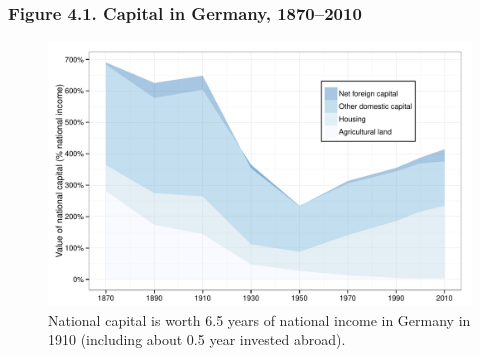 \documentclass[t]{beamer}\usepackage[]{graphicx}\usepackage[]{color}
\newenvironment{knitrout}{}{} %
\begin{document}
\begin{frame}[label=Figure_4_1]
\frametitle{Figure 4.1. Capital in Germany, 1870--2010}
\begin{figure}[t]
\begin{minipage}[b]{\textwidth}
\centering
\begin{knitrout}\footnotesize
{}\color{fgcolor}

{\centering \includegraphics[width=1\linewidth]{figures/color/Figure_4_1} 

}



\end{knitrout}
\caption{National capital is worth 6.5 years of national income in Germany in 1910 (including about 0.5 year invested abroad).}
\end{minipage}
\end{figure}
\end{frame}
\end{document}
